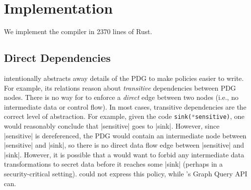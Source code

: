\chapter{Implementation}
\label{sec:limitations}
We implement the \syslang{} compiler in 2370 lines of Rust.

\section{Direct Dependencies}
\syslang{} intentionally abstracts away details of the PDG to make policies easier to write.
%
For example, its relations reason about \emph{transitive} dependencies between PDG nodes.
%
There is no way for \ces{} to enforce a \emph{direct} edge between two nodes (i.e., no intermediate data or control flow).
%
In most cases, transitive dependencies are the correct level of abstraction.
%
For example, given the code \lstinline[language=Rust]|sink(*sensitive)|,
one would reasonably conclude that |sensitive| goes to |sink|.
%
However, since |sensitive| is dereferenced, the PDG would contain an intermediate node between |sensitive| and |sink|,
so there is no direct data flow edge between |sensitive| and |sink|.
%
However, it is possible that a \dev{} would want to forbid any intermediate data transformations
to secret data before it reaches some |sink| (perhaps in a security-critical setting).
%
\syslang{} could not express this policy, while \sys{}'s Graph Query API can.

